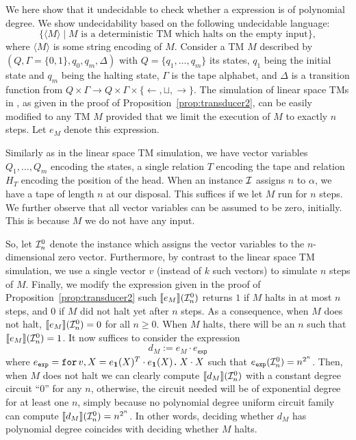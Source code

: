 We here show that it undecidable to check whether a \langfor expression is of polynomial degree.
We show undecidability based on the following undecidable language:
    $$
    \{ \langle M\rangle\mid \text{$M$ is a deterministic TM which halts on the empty input}\},
    $$
    where $\langle M\rangle$ is some string encoding of $M$.
    Consider a TM $M$ described by $(Q,\Gamma=\{0,1\},q_0,q_m,\Delta)$
    with $Q=\{q_1,\ldots,q_m\}$ its states, $q_1$ being the initial state and $q_m$ being
    the halting state, $\Gamma$ is the tape alphabet, and $\Delta$ is a transition function
    from $Q\times \Gamma\to Q\times\Gamma\times \{\leftarrow,\sqcup,\rightarrow\}$. The simulation
    of linear space TMs in \langfor, as given in the proof of Proposition~\ref{prop:transducer2}, can be easily modified to
    any TM $M$ provided that we limit the execution of $M$ to exactly $n$ steps. Let $e_M$ denote this expression. 
	
	Similarly
    as in the linear space TM simulation, we have vector variables $Q_1,\ldots,Q_m$ encoding the
    states, a single relation $T$ encoding the tape and relation $H_T$ encoding the position
    of the head.  When an instance $\mathcal{I}$ assigns $n$ to $\alpha$, we have a tape of length $n$ at our disposal. This suffices if we let $M$ run for $n$ steps. We further observe that all vector variables can be assumed to be zero, initially.
    This is because $M$ we do not have any input. 
	
	So, let $\mathcal{I}_n^0$ denote the instance which assigns the vector variables to the $n$-dimensional zero vector.  Furthermore, by contrast to the linear space TM simulation, we use a single vector $v$ (instead of $k$ such vectors) to simulate $n$ steps of $M$. Finally, we modify the expression given in the proof of Proposition~\ref{prop:transducer2} such $\llbracket e_M \rrbracket(\mathcal{I}_n^0)$  returns $1$ if $M$
    halts in at most $n$ steps, and $0$ if $M$ did not halt yet after $n$ steps.
    As a consequence, when $M$ does not halt, $\llbracket e_M \rrbracket(\mathcal{I}_n^0)=0$ for all $n\geq 0$. When $M$ halts, there will be an $n$ such that $\llbracket e_M \rrbracket(\mathcal{I}_n^0)=1$. It now suffices to consider the \langfor expression
    $$
    d_M:=e_M\cdot e_{\mathsf{exp}}
    $$
    where $e_{\texttt{exp}} = \texttt{for}\, v,X=e_{\mathbf{1}}(X)^T\cdot e_{\mathbf{1}}(X) \texttt{.}\, X\cdot X$ such that
    $e_{\texttt{exp}}(\mathcal{I}_n^0)=n^{2^n}$. Then, when $M$ does not halt we can clearly compute $\llbracket d_M \rrbracket(\mathcal{I}_n^0)$ with a constant degree circuit ``0''
    for any $n$, otherwise, the circuit needed will be of exponential degree
    for at least one $n$, simply because no polynomial degree uniform  circuit family can compute $\llbracket d_M \rrbracket(\mathcal{I}_n^0)=n^{2^n}$. In other words, deciding whether $d_M$ has polynomial degree coincides with deciding whether $M$ halts.
